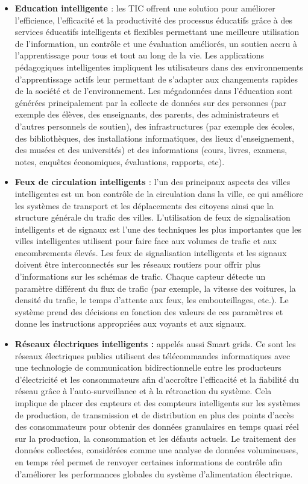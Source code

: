 \documentclass[french, a4paper, 12pt]{report}
\begin{document}
\begin{itemize}
\item \textbf{Education intelligente \cite{6}} : les TIC offrent une solution pour améliorer l'efficience, l'efficacité et la productivité des processus éducatifs grâce à des services éducatifs intelligents et flexibles permettant une meilleure utilisation de l'information, un contrôle et une évaluation améliorés, un soutien accru à l'apprentissage pour tous et tout au long de la vie. Les applications pédagogiques intelligentes impliquent les utilisateurs dans des environnements d’apprentissage actifs leur permettant de s’adapter aux changements rapides de la société et de l’environnement. Les mégadonnées dans l'éducation sont générées principalement par la collecte de données sur des personnes (par exemple des élèves, des enseignants, des parents, des administrateurs et d'autres personnels de soutien), des infrastructures (par exemple des écoles, des bibliothèques, des installations informatiques, des lieux d'enseignement, des musées et des universités) et des informations (cours, livres, examens, notes, enquêtes économiques, évaluations, rapports, etc). 
\item \textbf{Feux de circulation intelligents \cite{7}} : l’un des principaux aspects des villes intelligentes est un bon contrôle de la circulation dans la ville, ce qui améliore les systèmes de transport et les déplacements des citoyens ainsi que la structure générale du trafic des villes. L'utilisation de feux de signalisation intelligents et de signaux est l'une des techniques les plus importantes que les villes intelligentes utilisent pour faire face aux volumes de trafic et aux encombrements élevés. Les feux de signalisation intelligents et les signaux doivent être interconnectés sur les réseaux routiers pour offrir plus d'informations sur les schémas de trafic. Chaque capteur détecte un paramètre différent du flux de trafic (par exemple, la vitesse des voitures, la densité du trafic, le temps d'attente aux feux, les embouteillages, etc.). Le système prend des décisions en fonction des valeurs de ces paramètres et donne les instructions appropriées aux voyants et aux signaux. 
\item \textbf{Réseaux électriques intelligents :} appelés aussi Smart grids. Ce sont les réseaux électriques publics utilisent des télécommandes informatiques avec une technologie de communication bidirectionnelle entre les producteurs d'électricité et les consommateurs afin d'accroître l'efficacité et la fiabilité du réseau grâce à l'auto-surveillance et à la rétroaction du système. Cela implique de placer des capteurs et des compteurs intelligents sur les systèmes de production, de transmission et de distribution en plus des points d'accès des consommateurs pour obtenir des données granulaires en temps quasi réel sur la production, la consommation et les défauts actuels. Le traitement des données collectées, considérées comme une analyse de données volumineuses, en temps réel permet de renvoyer certaines informations de contrôle afin d'améliorer les performances globales du système d'alimentation électrique.

\end{itemize}
\end{document}
